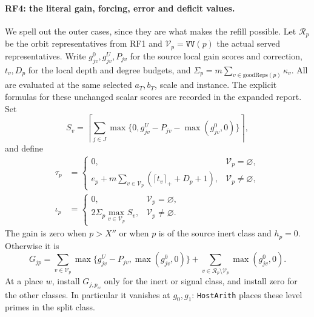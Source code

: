 \documentclass[11pt,a4paper]{article}
\numberwithin{equation}{section}
\theoremstyle{remark}\newtheorem{remark}[theorem]{Remark}
\begin{document}
\paragraph{RF4: the literal gain, forcing, error and deficit values.}
We spell out the outer cases, since they are what makes the refill
possible. Let $\mathcal R_p$ be the orbit representatives from RF1 and
$\mathcal V_p=\texttt{VV}(p)$ the actual served representatives. Write
$g^0_{jv},g^U_{jv},P_{jv}$ for the source local gain scores and correction,
$t_v,D_p$ for the local depth and degree budgets, and
$\Sigma_p=m\sum_{v\in\mathrm{goodReps}(p)}\kappa_v$.
All are evaluated at the same selected $a_T,b_T$, scale and instance.
The explicit formulas for these unchanged scalar scores are recorded in
the expanded report. Set
\[
 S_v=\left\lceil\sum_{j\in J}
        \max\{0,g^U_{jv}-P_{jv}-\max(g^0_{jv},0)\}\right\rceil,
                                                               \tag{RF.9}
\]
and define
\[
 \begin{split}
 \tau_p&=\begin{cases}0,&\mathcal V_p=\varnothing,\\
 e_p+m\sum_{v\in\mathcal V_p}(\lceil t_v\rceil_++D_p+1),
                                      &\mathcal V_p\ne\varnothing,
                         \end{cases}\\
 \iota_p&=\begin{cases}0,&\mathcal V_p=\varnothing,\\
 2\Sigma_p\max_{v\in\mathcal V_p}S_v,&\mathcal V_p\ne\varnothing.
                         \end{cases}                          
 \end{split}
 \tag{RF.10}
\]
The gain is zero when $p>X''$ or when $p$ is of the source inert class
and $h_p=0$. Otherwise it is
\[
 G_{jp}=\sum_{v\in\mathcal V_p}
       \max\{g^U_{jv}-P_{jv},\max(g^0_{jv},0)\}
          +\sum_{v\in\mathcal R_p\setminus\mathcal V_p}
                                      \max(g^0_{jv},0).         \tag{RF.11}
\]
At a place $w$, install $G_{j,p_w}$ only for the inert or signal class,
and install zero for the other classes. In particular it vanishes at
$g_0,g_1$: \texttt{HostArith} places these level primes in the split class.
\end{document}
